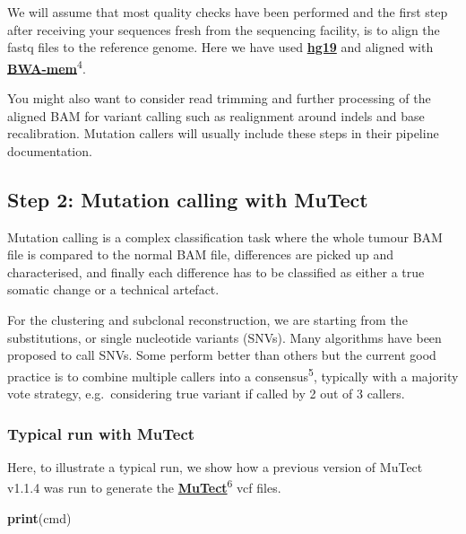 \documentclass[]{article}
\newenvironment{Shaded}{\begin{snugshade}}{\end{snugshade}}
\newcommand{\KeywordTok}[1]{\textcolor[rgb]{0.13,0.29,0.53}{\textbf{#1}}}
\newcommand{\NormalTok}[1]{#1}
\begin{document}
We will assume that most quality checks have been performed and the
first step after receiving your sequences fresh from the sequencing
facility, is to align the fastq files to the reference genome. Here we
have used
\href{http://ftp.1000genomes.ebi.ac.uk/vol1/ftp/technical/reference/phase2_reference_assembly_sequence/hs37d5.fa.gz}{\textbf{hg19}}
and aligned with
\href{https://github.com/lh3/bwa}{\textbf{BWA-mem}}\textsuperscript{4}.

You might also want to consider read trimming and further processing of
the aligned BAM for variant calling such as realignment around indels
and base recalibration. Mutation callers will usually include these
steps in their pipeline documentation.

\hypertarget{step-2-mutation-calling-with-mutect}{%
\subsection{Step 2: Mutation calling with
MuTect}\label{step-2-mutation-calling-with-mutect}}

Mutation calling is a complex classification task where the whole tumour
BAM file is compared to the normal BAM file, differences are picked up
and characterised, and finally each difference has to be classified as
either a true somatic change or a technical artefact.

For the clustering and subclonal reconstruction, we are starting from
the substitutions, or single nucleotide variants (SNVs). Many algorithms
have been proposed to call SNVs. Some perform better than others but the
current good practice is to combine multiple callers into a
consensus\textsuperscript{5}, typically with a majority vote strategy,
e.g.~considering true variant if called by 2 out of 3 callers.

\hypertarget{typical-run-with-mutect}{%
\subsubsection{Typical run with MuTect}\label{typical-run-with-mutect}}

Here, to illustrate a typical run, we show how a previous version of
MuTect v1.1.4 was run to generate the
\href{https://software.broadinstitute.org/cancer/cga/mutect_download}{\textbf{MuTect}}\textsuperscript{6}
vcf files.

\begin{Shaded}
\begin{Highlighting}[]
\KeywordTok{print}\NormalTok{(cmd)}
\end{Highlighting}
\end{Shaded}
\end{document}
